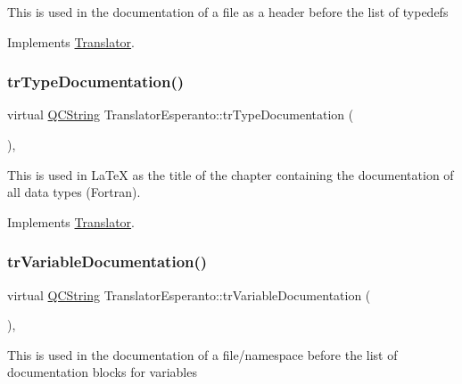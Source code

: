 This is used in the documentation of a file as a header before the list of typedefs 

Implements \mbox{\hyperlink{class_translator}{Translator}}.

\mbox{\label{class_translator_esperanto_a52f784558e4b2cdbfbe54e4716282053}} 
\subsubsection{\texorpdfstring{trTypeDocumentation()}{trTypeDocumentation()}}
{\footnotesize\ttfamily virtual \mbox{\hyperlink{class_q_c_string}{Q\+C\+String}} Translator\+Esperanto\+::tr\+Type\+Documentation (\begin{DoxyParamCaption}{ }\end{DoxyParamCaption})\hspace{0.3cm}{\ttfamily [inline]}, {\ttfamily [virtual]}}

This is used in La\+TeX as the title of the chapter containing the documentation of all data types (Fortran). 

Implements \mbox{\hyperlink{class_translator}{Translator}}.

\mbox{\label{class_translator_esperanto_a7a4e348f9c7ed6ece589630356ef6724}} 
\subsubsection{\texorpdfstring{trVariableDocumentation()}{trVariableDocumentation()}}
{\footnotesize\ttfamily virtual \mbox{\hyperlink{class_q_c_string}{Q\+C\+String}} Translator\+Esperanto\+::tr\+Variable\+Documentation (\begin{DoxyParamCaption}{ }\end{DoxyParamCaption})\hspace{0.3cm}{\ttfamily [inline]}, {\ttfamily [virtual]}}

This is used in the documentation of a file/namespace before the list of documentation blocks for variables 

